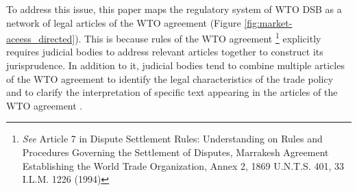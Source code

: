 To address this issue, 
this paper maps 
the regulatory system of WTO DSB 
as a network of legal articles 
of the WTO agreement (Figure \ref{fig:market-aceess_directed}). 
This is because rules of the WTO agreement
\footnote{\textit{See} Article 7 in Dispute Settlement Rules: Understanding on Rules and Procedures Governing the Settlement of Disputes, Marrakesh Agreement Establishing the World Trade Organization, Annex 2, 1869 U.N.T.S. 401, 33 I.L.M. 1226 (1994)} 
explicitly requires judicial bodies to address
relevant articles together to construct its jurisprudence.
In addition to it, judicial bodies tend to combine 
multiple articles of the WTO agreement 
to identify the legal characteristics of the trade policy 
and to clarify the interpretation of specific text 
appearing in the articles of the WTO agreement 
\citep{oesch2003standards}.




